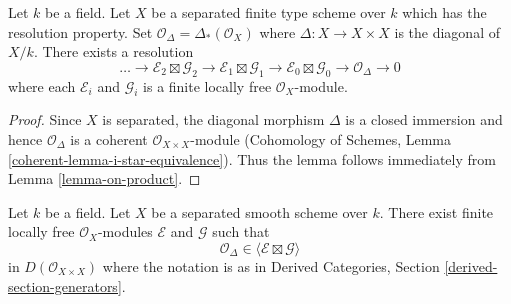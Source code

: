 \begin{lemma}
\label{lemma-diagonal-resolution}
Let $k$ be a field. Let $X$ be a separated finite type scheme over $k$
which has the resolution property. Set
$\mathcal{O}_\Delta = \Delta_*(\mathcal{O}_X)$ where
$\Delta : X \to X \times X$ is the diagonal of $X/k$.
There exists a resolution
$$
\ldots \to
\mathcal{E}_2 \boxtimes \mathcal{G}_2 \to
\mathcal{E}_1 \boxtimes \mathcal{G}_1 \to
\mathcal{E}_0 \boxtimes \mathcal{G}_0 \to
\mathcal{O}_\Delta \to 0
$$
where each $\mathcal{E}_i$ and $\mathcal{G}_i$ is a finite locally
free $\mathcal{O}_X$-module.
\end{lemma}

\begin{proof}
Since $X$ is separated, the diagonal morphism $\Delta$ is a closed
immersion and hence $\mathcal{O}_\Delta$ is a coherent
$\mathcal{O}_{X \times X}$-module (Cohomology of Schemes, Lemma
\ref{coherent-lemma-i-star-equivalence}).
Thus the lemma follows immediately from Lemma \ref{lemma-on-product}.
\end{proof}

\begin{lemma}
\label{lemma-diagonal-trick}
Let $k$ be a field. Let $X$ be a separated smooth scheme over $k$.
There exist finite locally free $\mathcal{O}_X$-modules
$\mathcal{E}$ and $\mathcal{G}$ such that
$$
\mathcal{O}_\Delta \in \langle \mathcal{E} \boxtimes \mathcal{G} \rangle
$$
in $D(\mathcal{O}_{X \times X})$ where the notation is as in
Derived Categories, Section \ref{derived-section-generators}.
\end{lemma}

